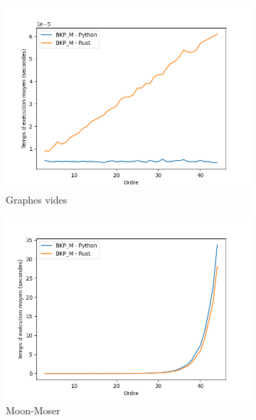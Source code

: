 \documentclass[12pt,a4paper]{article}
\begin{document}
\begin{figure}[h!]
\begin{subfigure}[b]{0.32\textwidth}
    \includegraphics[width=\textwidth]{images/total_BKP_M_new_pyrust_pivot_empty_plot.png}
  \caption{Graphes vides}%
  \label{subfig:pr2_BKP_M_empty}
  \end{subfigure}
  \begin{subfigure}[b]{0.32\textwidth}
    \includegraphics[width=\textwidth]{images/total_BKP_M_new_pyrust_pivot_turan_plot.png}
  \caption{Moon-Moser}%
  \label{subfig:pr2_BKP_M_turan}
  \end{subfigure}
  \begin{subfigure}[b]{0.32\textwidth}

\end{subfigure}
\end{figure}
\end{document}
